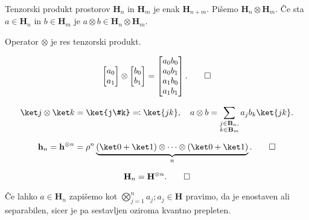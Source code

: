 \documentclass[mat1]{fmfdelo}
\newcommand{\hh}[1][]{\mathbf{h}_{#1}}
\newcommand{\B}[1][]{\mathbf{B}_{#1}}
\renewcommand{\H}[1][]{\mathbf{H}_{#1}}
\begin{document}
\begin{definicija}
    Tenzorski produkt prostorov \( \H[n] \) in \( \H[m] \) je enak \( \H[n+m] \).
    Pišemo \( \H[n]\otimes\H[m] \). Če sta \( a\in\H[n] \) in \( b\in\H[m] \) je \( a\otimes b \in \H[n]\otimes\H[m] \).
\end{definicija}
\begin{opomba}
    Operator \(\otimes\) je res tenzorski produkt.
\end{opomba}

\begin{primer}[\(n=m=1\)]
    \[
        \begin{bmatrix}a_0 \\ a_1\end{bmatrix}\otimes \begin{bmatrix}b_0 \\ b_1\end{bmatrix}
        = \begin{bmatrix}a_0b_0\\ a_0b_1\\ a_1b_0\\ a_1b_1\end{bmatrix}\text.\qedhere
    \]
\end{primer}

\begin{primer}
    \[
        \ket j \otimes \ket k = \ket{j\#k} \eqqcolon \ket{jk},\quad
        a\otimes b = \sum_{\substack{j\in\B[n],\\k\in\B[m]}} a_jb_k\ket{jk}.
    \]
\end{primer}

\begin{primer}
    \[
        \hh[n] = \hh^{\otimes n} = \rho^n\underbrace{(\ket 0 + \ket 1)\otimes\dots\otimes(\ket 0 + \ket 1)}_n\text.\qedhere
    \]
\end{primer}
\begin{primer}
    \[\H[n] = \H^{\otimes n}\text.\qedhere\]
\end{primer}

\begin{definicija}
    Če lahko \(a\in\H[n]\) zapišemo kot \(\bigotimes_{j=1}^{n} a_j; a_j\in\H\) pravimo, da je enostaven ali separabilen, sicer je pa sestavljen oziroma kvantno prepleten.
\end{definicija}
\end{document}
